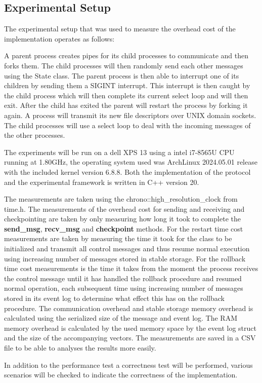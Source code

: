 \documentclass[twocolumn, a4paper,11pt]{article}%
\begin{document}
\subsection{Experimental Setup}
The experimental setup that was used to measure the overhead cost of the implementation operates as follows:
\par A parent process  creates pipes for its child processes to communicate and then forks them. The child processes will then randomly send each other messages using the State class. The parent process is then able to interrupt one of its children by sending them a SIGINT interrupt. This interrupt is then caught by the child process which will then complete its current select loop and will then exit. After the child has exited the parent will restart the process by forking it again.  A process will transmit its new file descriptors over UNIX domain sockets.
The child processes will use a select loop to deal with the incoming messages of the other processes.
\par The experiments will be run on a dell XPS 13 using a intel i7-8565U CPU running at 1.80GHz, the operating system used was ArchLinux 2024.05.01 release with the included kernel version 6.8.8.  Both the implementation of the protocol and the experimental framework is written in C++ version 20. 
\par The measurements are taken using the chrono::high\_resolution\_clock from time.h.  The measurements of the overhead cost for sending and receiving and checkpointing are taken by only measuring how long it took to complete the \textbf{send\_msg}, \textbf{recv\_msg} and \textbf{checkpoint} methods. For the restart time cost measurements are taken by measuring the time it took for the class to be initialized and transmit all control messages and thus resume normal execution using increasing number of messages stored in stable storage. For the rollback time cost measurements is the time it takes from the moment the process receives the control message until it has handled the rollback procedure and resumed normal operation, each subsequent time using increasing number of messages stored in its event log to determine what effect this has on the rollback procedure.
The communication overhead and stable storage memory overhead is calculated using the serialized size of the message and event log. The RAM memory overhead is calculated by the used memory space by the event log struct and the size of the accompanying vectors.
The measurements are saved in a CSV file to be able to analyses the results more easily. 
\par In addition to the performance test a correctness test will be performed, various scenarios will be checked to indicate the correctness of the implementation. 
\end{document}
